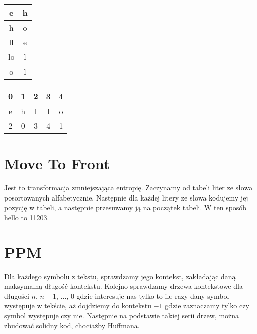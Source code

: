 \documentclass{../notatki}
\begin{document}
\begin{multicols}{2}
\begin{center}
    \begin{tabular}{|c|c|}
      \hline
      e & h \\
      \hline
      \rowcolor{gray!50}
      h & o \\
      \hline
      ll & e \\
      \hline
      lo & l \\
      \hline
      o & l \\
      \hline
    \end{tabular}
    \begin{tabular}{|c|c|c|c|c|}
      \hline
      \rowcolor{gray!50}
      0 & 1 & 2 & 3 & 4 \\
      \hline
      e & h & l & l & o \\
      \hline
      2 & 0 & 3 & 4 & 1 \\
      \hline
    \end{tabular}
  \end{center}

  \section{Move To Front}

  Jest to transformacja zmniejszająca entropię. Zaczynamy od tabeli liter
  ze słowa posortowanych alfabetycznie. Następnie dla każdej litery ze słowa
  kodujemy jej pozycję w tabeli, a następnie przesuwamy ją na początek
  tabeli. W ten sposób hello to 11203.

  \section{PPM}

  Dla każdego symbolu z tekstu, sprawdzamy jego kontekst, zakładając daną
  maksymalną długość kontekstu. Kolejno sprawdzamy drzewa kontekstowe dla
  długości $n$, $n-1$, $\dots$, $0$ gdzie interesuje nas tylko to ile razy
  dany symbol występuje w tekście, aż dojdziemy do kontekstu $-1$ gdzie
  zaznaczamy tylko czy symbol występuje czy nie. Następnie na podstawie
  takiej serii drzew, można zbudować solidny kod, chociażby Huffmana.


\end{multicols}
\end{document}

